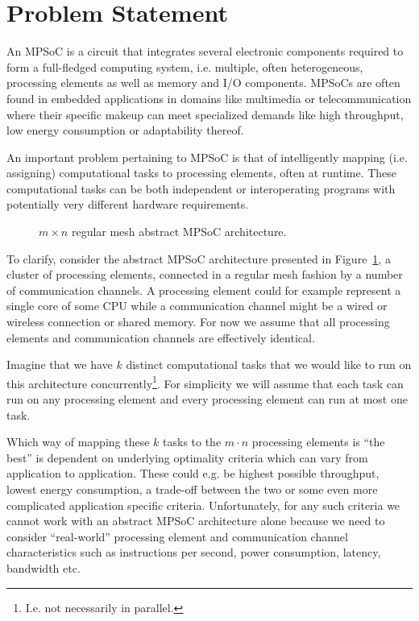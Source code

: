 \section{Problem Statement}
\label{sec:mot_problem_statement}

An MPSoC is a circuit that integrates several electronic components required to
form a full-fledged computing system, i.e. multiple, often heterogeneous,
processing elements as well as memory and I/O components. MPSoCs are often found in
embedded applications in domains like multimedia or telecommunication where
their specific makeup can meet specialized demands like high throughput, low
energy consumption or adaptability thereof.

An important problem pertaining to MPSoC is that of intelligently mapping (i.e.
assigning) computational tasks to processing elements, often at runtime.  These
computational tasks can be both independent or interoperating programs with
potentially very different hardware requirements.

\begin{figure}
  \centering
  \caption{$m \times n$ regular mesh abstract MPSoC architecture.}
  \label{fig:regular_mesh_m_n}
\end{figure}

To clarify, consider the abstract MPSoC architecture presented in
Figure~\ref{fig:regular_mesh_m_n}, a cluster of processing elements, connected
in a regular mesh fashion by a number of communication channels. A processing
element could for example represent a single core of some CPU while a
communication channel might be a wired or wireless connection or shared memory.
For now we assume that all processing elements and communication channels are
effectively identical.

Imagine that we have $k$ distinct computational tasks that we would like to run
on this architecture concurrently\footnote{I.e. not necessarily in parallel.}.
For simplicity we will assume that each task can run on any processing element
and every processing element can run at most one task.

Which way of mapping these $k$ tasks to the $m \cdot n$ processing elements is
``the best'' is dependent on underlying optimality criteria which can vary from
application to application. These could e.g. be highest possible throughput,
lowest energy consumption, a trade-off between the two or some even more
complicated application specific criteria.
%
Unfortunately, for any such criteria we cannot work with an abstract MPSoC
architecture alone because we need to consider ``real-world'' processing
element and communication channel characteristics such as instructions per
second, power consumption, latency, bandwidth etc.

